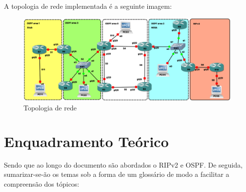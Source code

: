 \documentclass[11pt,english, openright, oneside]{book}
\begin{document}
A topologia de rede implementada é a seguinte imagem:

\begin{figure}[H]
    \centering
    \includegraphics[width=1\textwidth]{imagens/topologia.png}
    \caption{Topologia de rede}
    \label{fig:topologia}
\end{figure}

\chapter{Enquadramento Teórico}
Sendo que ao longo do documento são abordados o RIPv2 e OSPF. De seguida, sumarizar-se-ão os temas 
sob a forma de um glossário de modo a facilitar a compreensão dos tópicos:
\end{document}
